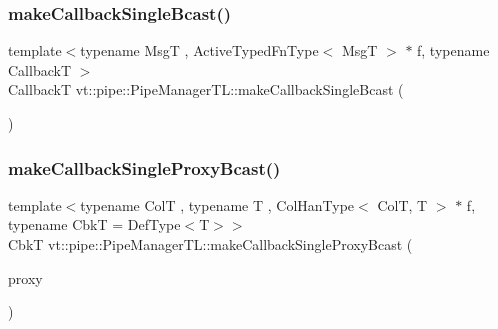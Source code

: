 \mbox{\label{structvt_1_1pipe_1_1_pipe_manager_t_l_a44999ebff93b29e571e928b0695ed120}} 
\subsubsection{\texorpdfstring{make\+Callback\+Single\+Bcast()}{makeCallbackSingleBcast()}\hspace{0.1cm}{\footnotesize\ttfamily [2/2]}}
{\footnotesize\ttfamily template$<$typename MsgT , Active\+Typed\+Fn\+Type$<$ Msg\+T $>$ $\ast$ f, typename CallbackT $>$ \\
CallbackT vt\+::pipe\+::\+Pipe\+Manager\+T\+L\+::make\+Callback\+Single\+Bcast (\begin{DoxyParamCaption}{ }\end{DoxyParamCaption})}

\mbox{\label{structvt_1_1pipe_1_1_pipe_manager_t_l_a0f66ce82b544151cbdec67a13a6ead34}} 
\subsubsection{\texorpdfstring{make\+Callback\+Single\+Proxy\+Bcast()}{makeCallbackSingleProxyBcast()}\hspace{0.1cm}{\footnotesize\ttfamily [1/2]}}
{\footnotesize\ttfamily template$<$typename ColT , typename T , Col\+Han\+Type$<$ Col\+T, T $>$ $\ast$ f, typename CbkT  = Def\+Type$<$\+T$>$$>$ \\
CbkT vt\+::pipe\+::\+Pipe\+Manager\+T\+L\+::make\+Callback\+Single\+Proxy\+Bcast (\begin{DoxyParamCaption}\item[{\hyperlink{structvt_1_1pipe_1_1_pipe_manager_t_l_af56c58cad882496e35f01227d4da3898}{Col\+Proxy\+Type}$<$ ColT $>$}]{proxy }\end{DoxyParamCaption})}

